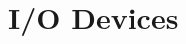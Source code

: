 \documentclass[a4paper,11pt,english]{article}
\begin{document}


\textbf{\color{blue} }

\section*{I/O Devices}
\end{document}
